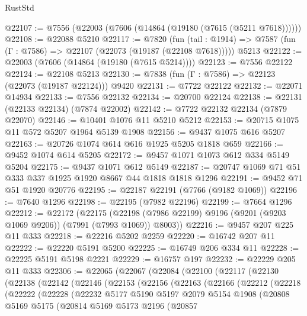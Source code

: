 \begin{lexlean}{RustStd}
\begin{coremodule}
@22107 := @7556 (@22003 (@7606 (@14864 (@19180 (@7615 (@5211 @7618))))))
@22108 := @22088 @5210
@22117 := @7820
    (fun (tail : @1914) => @7587 (fun (Γ : @7586) => @22107 (@22073 (@19187 (@22108 @7618)))))
    @5213
@22122 := @22003 (@7606 (@14864 (@19180 (@7615 @5214))))
@22123 := @7556 @22122
@22124 := @22108 @5213
@22130 := @7838 (fun (Γ : @7586) => @22123 (@22073 (@19187 @22124))) @9420
@22131 := @7722 @22122
@22132 := @22071 @14934
@22133 := @7556 @22132
@22134 := @20700 @22124
@22138 := @22131 (@22133 @22134) (@7874 @22002)
@22142 := @7722 @22132 @22134 (@7879 @22070)
@22146 := @10401 @1076 @11 @5210 @5212
@22153 := @20715 @1075 @11 @572 @5207 @1964 @5139 @1908
@22156 := @9437 @1075 @616 @5207
@22163 := @20726 @1074 @614 @616 @1925 @5205 @1818 @659
@22166 := @9452 @1074 @614 @5205
@22172 := @9457 @1071 @1073 @612 @334 @5149 @5204
@22175 := @9437 @1071 @612 @5149
@22187 := @20747 @1069 @71 @51 @333 @337 @1925 @1920 @8667 @44 @1818 @1818 @1296
@22191 := @9452 @71 @51 @1920 @20776
@22195 := @22187 @22191 (@7766 (@9182 @1069))
@22196 := @7640 @1296
@22198 := @22195 (@7982 @22196)
@22199 := @7664 @1296
@22212 := @22172
    (@22175 (@22198 (@7986 @22199) @9196 (@9201 (@9203 @1069 @9206)) (@7991 (@7993 @1069)) @8003))
@22216 := @9457 @207 @225 @11 @333
@22218 := @22216 @5202 @2259
@22220 := @16742 @207 @11
@22222 := @22220 @5191 @5200
@22225 := @16749 @206 @334 @11
@22228 := @22225 @5191 @5198 @2221
@22229 := @16757 @197
@22232 := @22229 @205 @11 @333
@22306 := @22065
    (@22067
      (@22084
        (@22100
          (@22117
            (@22130
              (@22138
                (@22142
                  (@22146
                    (@22153
                      (@22156
                        (@22163
                          (@22166
                            (@22212
                              (@22218
                                (@22222
                                  (@22228
                                    (@22232
                                      @5177
                                      @5190
                                      @5197
                                      @2079
                                      @5154
                                      @1908
                                      (@20808
                                        @5169
                                        @5175
                                        (@20814
                                          @5169
                                          @5173
                                          @2196
                                          (@20857

\end{coremodule}
\end{lexlean}
